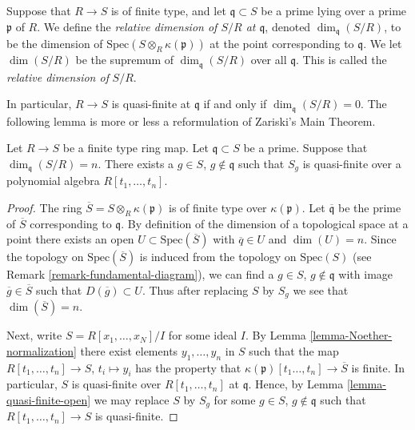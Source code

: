 \begin{definition}
\label{definition-relative-dimension}
Suppose that $R \to S$ is of finite type, and let
$\mathfrak q \subset S$ be a prime lying over a prime
$\mathfrak p$ of $R$.
We define the {\it relative dimension
of $S/R$ at $\mathfrak q$}, denoted
$\dim_{\mathfrak q}(S/R)$, to be the dimension
of $\text{Spec}(S \otimes_R \kappa(\mathfrak p))$
at the point corresponding to $\mathfrak q$. We let
$\dim(S/R)$ be the supremum of $\dim_{\mathfrak q}(S/R)$
over all $\mathfrak q$. This is called the
{\it relative dimension of} $S/R$.
\end{definition}

\noindent
In particular, $R \to S$ is quasi-finite at $\mathfrak q$ if
and only if $\dim_{\mathfrak q}(S/R) = 0$. The following lemma
is more or less a reformulation of Zariski's Main Theorem.

\begin{lemma}
\label{lemma-quasi-finite-over-polynomial-algebra}
Let $R \to S$ be a finite type ring map.
Let $\mathfrak q \subset S$ be a prime.
Suppose that $\dim_{\mathfrak q}(S/R) = n$.
There exists a $g \in S$, $g \not\in \mathfrak q$
such that $S_g$ is quasi-finite over a
polynomial algebra $R[t_1, \ldots, t_n]$.
\end{lemma}

\begin{proof}
The ring $\overline{S} = S \otimes_R \kappa(\mathfrak p)$ is
of finite type over $\kappa(\mathfrak p)$.
Let $\overline{\mathfrak q}$ be the prime of $\overline{S}$
corresponding to $\mathfrak q$.
By definition of
the dimension of a topological space at a point there exists
an open $U \subset \text{Spec}(\overline{S})$ with
$\overline{q} \in U$ and $\dim(U) = n$.
Since the topology on $\text{Spec}(\overline{S})$ is
induced from the topology on $\text{Spec}(S)$ (see
Remark \ref{remark-fundamental-diagram}), we can find
a $g \in S$, $g \not \in \mathfrak q$ with image
$\overline{g} \in \overline{S}$ such that
$D(\overline{g}) \subset U$.
Thus after replacing $S$ by $S_g$ we see that
$\dim(\overline{S}) = n$.

\medskip\noindent
Next, write $S = R[x_1, \ldots, x_N]/I$ for some ideal $I$.
By Lemma \ref{lemma-Noether-normalization} there exist
elements $y_1, \ldots, y_n$ in $S$ such that the map
$R[t_1, \ldots, t_n] \to S$, $t_i \mapsto y_i$ has the property
that $\kappa(\mathfrak p)[t_1\ldots, t_n] \to \overline{S}$
is finite. In particular, $S$ is quasi-finite over $R[t_1, \ldots, t_n]$
at $\mathfrak q$. Hence, by Lemma \ref{lemma-quasi-finite-open}
we may replace $S$ by $S_g$ for some $g\in S$, $g \not \in \mathfrak q$
such that $R[t_1, \ldots, t_n] \to S$ is quasi-finite.
\end{proof}

